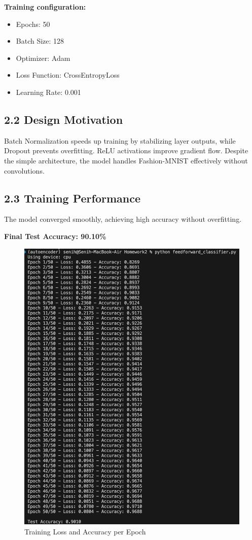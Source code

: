 \documentclass[12pt]{article}
\begin{document}
\textbf{Training configuration:}

\begin{itemize}
    \item Epochs: 50
    \item Batch Size: 128
    \item Optimizer: Adam
    \item Loss Function: CrossEntropyLoss
    \item Learning Rate: 0.001
\end{itemize}

\subsection*{2.2 Design Motivation}

Batch Normalization speeds up training by stabilizing layer outputs, while Dropout prevents overfitting. ReLU activations improve gradient flow. Despite the simple architecture, the model handles Fashion-MNIST effectively without convolutions.

\subsection*{2.3 Training Performance}

The model converged smoothly, achieving high accuracy without overfitting.

\begin{center}
\textbf{Final Test Accuracy: 90.10\%}
\end{center}

\begin{figure}[H]
    \centering
    \includegraphics[width=0.9\linewidth]{question2_test_scores.png}
    \caption{Training Loss and Accuracy per Epoch}
\end{figure}
\end{document}
